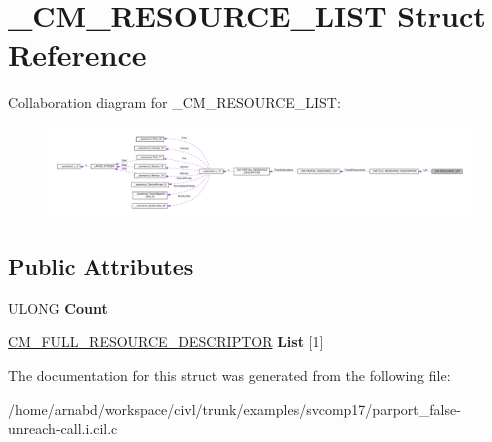 \hypertarget{struct__CM__RESOURCE__LIST}{}\section{\+\_\+\+C\+M\+\_\+\+R\+E\+S\+O\+U\+R\+C\+E\+\_\+\+L\+I\+S\+T Struct Reference}
\label{struct__CM__RESOURCE__LIST}


Collaboration diagram for \+\_\+\+C\+M\+\_\+\+R\+E\+S\+O\+U\+R\+C\+E\+\_\+\+L\+I\+S\+T\+:
\nopagebreak
\begin{figure}[H]
\begin{center}
\leavevmode
\includegraphics[width=350pt]{struct__CM__RESOURCE__LIST__coll__graph}
\end{center}
\end{figure}
\subsection*{Public Attributes}
\begin{DoxyCompactItemize}
\item 
\hypertarget{struct__CM__RESOURCE__LIST_abf46fdd44fa0ab63e7a9feb41691d390}{}U\+L\+O\+N\+G {\bfseries Count}\label{struct__CM__RESOURCE__LIST_abf46fdd44fa0ab63e7a9feb41691d390}

\item 
\hypertarget{struct__CM__RESOURCE__LIST_a368a385a85c42807956ece16d4be095e}{}\hyperlink{struct__CM__FULL__RESOURCE__DESCRIPTOR}{C\+M\+\_\+\+F\+U\+L\+L\+\_\+\+R\+E\+S\+O\+U\+R\+C\+E\+\_\+\+D\+E\+S\+C\+R\+I\+P\+T\+O\+R} {\bfseries List} \mbox{[}1\mbox{]}\label{struct__CM__RESOURCE__LIST_a368a385a85c42807956ece16d4be095e}

\end{DoxyCompactItemize}


The documentation for this struct was generated from the following file\+:\begin{DoxyCompactItemize}
\item 
/home/arnabd/workspace/civl/trunk/examples/svcomp17/parport\+\_\+false-\/unreach-\/call.\+i.\+cil.\+c\end{DoxyCompactItemize}
